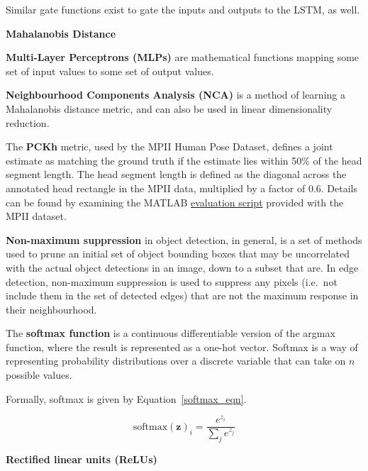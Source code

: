 \documentclass[a4paper, 12pt]{article}
\newcommand\phantomlabel[1]{\phantomsection\label{#1}}
\begin{document}
Similar gate functions exist to gate the inputs and outputs to the LSTM, as
well.


\textbf{Mahalanobis Distance}


\phantomlabel{multilayer_perceptron}
\textbf{Multi-Layer Perceptrons (MLPs)} are mathematical functions mapping some
set of input values to some set of output
values\cite{Goodfellow-et-al-2016-Book}.


\textbf{Neighbourhood Components Analysis (NCA)} is a method of learning a
Mahalanobis distance metric, and can also be used in linear dimensionality
reduction\cite{NIPS2004_2566}.

The \textbf{PCKh} metric, used by the MPII Human Pose Dataset, defines a joint
estimate as matching the ground truth if the estimate lies within 50\% of the
head segment length\cite{andriluka-2d-2014-853}. The head segment length is
defined as the diagonal across the annotated head rectangle in the MPII data,
multiplied by a factor of 0.6. Details can be found by examining the MATLAB
\href{http://human-pose.mpi-inf.mpg.de/results/mpii_human_pose/evalMPII.zip}{evaluation script}
provided with the MPII dataset.


\phantomlabel{nonmax_supression}
\textbf{Non-maximum suppression} in object detection, in general, is a set of
methods used to prune an initial set of object bounding boxes that may be
uncorrelated with the actual object detections in an image, down to a subset
that are\cite{DBLP:conf/accv/RotheGG14}. In edge detection, non-maximum
suppression is used to suppress any pixels (i.e.\ not include them in the set of
detected edges) that are not the maximum response in their neighbourhood.

The \textbf{softmax function} is a continuous differentiable version of the
argmax function, where the result is represented as a one-hot
vector\cite[Chapter~6]{Goodfellow-et-al-2016-Book}. Softmax is a way of
representing probability distributions over a discrete variable that can take
on $n$ possible values.

Formally, softmax is given by Equation~\ref{softmax_eqn}.

\begin{equation}
        \textrm{softmax}{(\boldsymbol{z})}_i = \frac{e^{z_i}}{\sum_je^{z_j}}
        \label{softmax_eqn}
\end{equation}


\phantomlabel{rectified_linear_units}
\textbf{Rectified linear units (ReLUs)}\cite{icml2010_NairH10}
\end{document}
